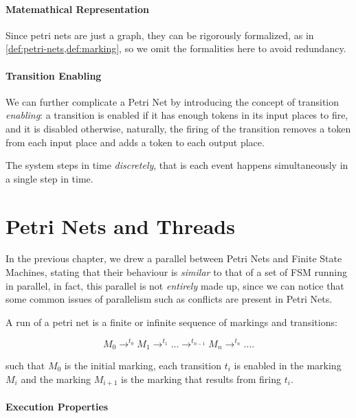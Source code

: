\documentclass[openright, twoside, twocolumn, a4paper, 10pt]{report}
\begin{document}
\paragraph{Matemathical Representation}
Since petri nets are just a graph, they can be rigorously formalized, as in \cref{def:petri-nets,def:marking}, so we omit
the formalities here to avoid redundancy.

\paragraph{Transition Enabling}

We can further complicate a Petri Net by introducing the concept of transition \emph{enabling}: a transition
is enabled if it has enough tokens in its input places to fire, and it is disabled otherwise, naturally,
the firing of the transition removes a token from each input place and adds a token to each output place.

The system steps in time \emph{discretely}, that is each event happens simultaneously in a single step in
time.

\section{Petri Nets and Threads}

In the previous chapter, we drew a parallel between Petri Nets and Finite State Machines, stating that their behaviour is \emph{similar} to that of a set of FSM running in parallel, in fact, this parallel is not \emph{entirely} made up, since we can notice that some common issues of parallelism such as conflicts are present in Petri Nets.

\begin{definition}\label{def:petri-net-run}

	A run of a petri net is a finite or infinite sequence of markings and transitions:

	\[
		M_0 \to^{ t_0} M_1 \to^{ t_1} \ldots \to^{ t_{n-1} } M_n \to^{ t_n} \ldots
		.\]

	such that $ M_0$ is the initial marking, each transition $ t_i$ is enabled in the marking $M_i$ and the marking $M_{i+1}$ is the marking that results from firing $ t_i$.

\end{definition}

\paragraph{Execution Properties}
\end{document}
